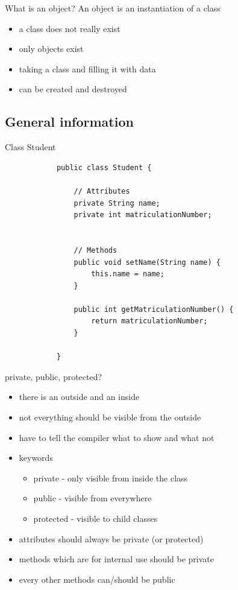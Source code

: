 	\begin{frame}[fragile]{What is an object?}
		An object is an instantiation of a class
		\begin{itemize}
			\item a class does not really exist
			\item only objects exist
			\item taking a class and filling it with data
			\item can be created and destroyed
		\end{itemize} 
	\end{frame}
	
	\subsection{General information}
	
	\begin{frame}[fragile]{Class Student}
		\begin{lstlisting}
			public class Student {
				
				// Attributes
				private String name; 
				private int matriculationNumber; 
				
				
				// Methods
				public void setName(String name) {
					this.name = name;
				}
				
				public int getMatriculationNumber() {
					return matriculationNumber;
				}
				
			}
		\end{lstlisting}
		
		
	\end{frame}

	\begin{frame}{private, public, protected?}
		\begin{itemize}
			\item<1-> there is an outside and an inside
			\item<2-> not everything should be visible from the outside
			\item<3-> have to tell the compiler what to show and what not
			\item<4-> keywords \\
				\begin{itemize}
					\item private - only visible from inside the class
					\item public - visible from everywhere
					\item protected - visible to child classes
				\end{itemize}
			
			\item<5-> attributes should always be private (or protected)
			\item<6-> methods which are for internal use should be private
			\item<7-> every other methods can/should be public
		\end{itemize}
	\end{frame}

